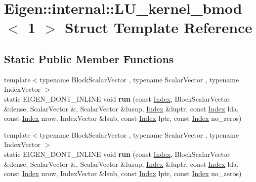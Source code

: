 \hypertarget{struct_eigen_1_1internal_1_1_l_u__kernel__bmod_3_011_01_4}{}\section{Eigen\+:\+:internal\+:\+:L\+U\+\_\+kernel\+\_\+bmod$<$ 1 $>$ Struct Template Reference}
\label{struct_eigen_1_1internal_1_1_l_u__kernel__bmod_3_011_01_4}
\subsection*{Static Public Member Functions}
\begin{DoxyCompactItemize}
\item 
\mbox{\label{struct_eigen_1_1internal_1_1_l_u__kernel__bmod_3_011_01_4_a92357890c666e71a99e9324b1465ca3c}} 
{\footnotesize template$<$typename Block\+Scalar\+Vector , typename Scalar\+Vector , typename Index\+Vector $>$ }\\static E\+I\+G\+E\+N\+\_\+\+D\+O\+N\+T\+\_\+\+I\+N\+L\+I\+NE void {\bfseries run} (const \hyperlink{namespace_eigen_a62e77e0933482dafde8fe197d9a2cfde}{Index}, Block\+Scalar\+Vector \&dense, Scalar\+Vector \&, Scalar\+Vector \&lusup, \hyperlink{namespace_eigen_a62e77e0933482dafde8fe197d9a2cfde}{Index} \&luptr, const \hyperlink{namespace_eigen_a62e77e0933482dafde8fe197d9a2cfde}{Index} lda, const \hyperlink{namespace_eigen_a62e77e0933482dafde8fe197d9a2cfde}{Index} nrow, Index\+Vector \&lsub, const \hyperlink{namespace_eigen_a62e77e0933482dafde8fe197d9a2cfde}{Index} lptr, const \hyperlink{namespace_eigen_a62e77e0933482dafde8fe197d9a2cfde}{Index} no\+\_\+zeros)
\item 
\mbox{\label{struct_eigen_1_1internal_1_1_l_u__kernel__bmod_3_011_01_4_adef67993f372db1af2f1fdb3de705d18}} 
{\footnotesize template$<$typename Block\+Scalar\+Vector , typename Scalar\+Vector , typename Index\+Vector $>$ }\\static E\+I\+G\+E\+N\+\_\+\+D\+O\+N\+T\+\_\+\+I\+N\+L\+I\+NE void {\bfseries run} (const \hyperlink{namespace_eigen_a62e77e0933482dafde8fe197d9a2cfde}{Index}, Block\+Scalar\+Vector \&dense, Scalar\+Vector \&, Scalar\+Vector \&lusup, \hyperlink{namespace_eigen_a62e77e0933482dafde8fe197d9a2cfde}{Index} \&luptr, const \hyperlink{namespace_eigen_a62e77e0933482dafde8fe197d9a2cfde}{Index} lda, const \hyperlink{namespace_eigen_a62e77e0933482dafde8fe197d9a2cfde}{Index} nrow, Index\+Vector \&lsub, const \hyperlink{namespace_eigen_a62e77e0933482dafde8fe197d9a2cfde}{Index} lptr, const \hyperlink{namespace_eigen_a62e77e0933482dafde8fe197d9a2cfde}{Index} no\+\_\+zeros)
\end{DoxyCompactItemize}


